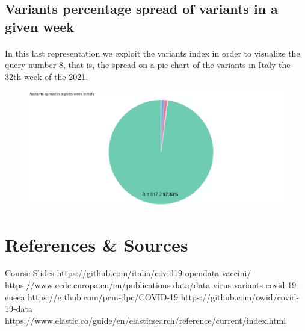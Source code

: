\documentclass[a4paper,12pt]{article}
\begin{document}
\subsection{Variants percentage spread of variants in a given week}
\paragraph{}In this last representation we exploit the variants index in order to visualize the query number 8, that is, the spread on a pie chart of the variants in Italy the 32th week of the 2021.
\begin{figure}[h]
	\centering
  \includegraphics[width=\linewidth]{dashboards/dash10.png}
\end{figure}
\newpage

\section{References \& Sources}
  \begin{thebibliography}{9}
    \bibitem{} Course Slides
    \bibitem{} https://github.com/italia/covid19-opendata-vaccini/
    \bibitem{} https://www.ecdc.europa.eu/en/publications-data/data-virus-variants-covid-19-eueea
    \bibitem{} https://github.com/pcm-dpc/COVID-19
    \bibitem{} https://github.com/owid/covid-19-data
    \bibitem{} https://www.elastic.co/guide/en/elasticsearch/reference/current/index.html
  \end{thebibliography}
\end{document}
